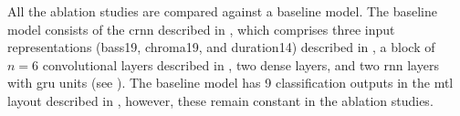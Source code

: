
All the ablation studies are compared against a baseline
model. The baseline model consists of the \gls{crnn}
described in , which comprises three
input representations (\gls{bass19}, \gls{chroma19}, and
\gls{duration14}) described in ,
a block of $n=6$ convolutional layers described in
, two dense layers, and two
\gls{rnn} layers with \gls{gru} units (see
). The baseline model has 9
classification outputs in the \gls{mtl} layout described in
, however, these remain
constant in the ablation studies.
